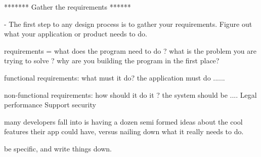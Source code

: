 *******   Gather the requirements  ******

- The first step to any design process is to gather your requirements.
Figure out what your application or product needs to do.

requirements = what does the program need to do ?
what is the problem you are trying to solve ?
why are you building the program in the first place? 


functional requirements:
  what must it do?
  the application must do ......



non-functional requirements:
  how should it do it ?
  the system should be ....
    Legal 
    performance 
    Support 
    security

many developers fall into is having a dozen semi formed ideas about the cool features their app could have, versus nailing down what it really needs to do.

be specific, and write things down.